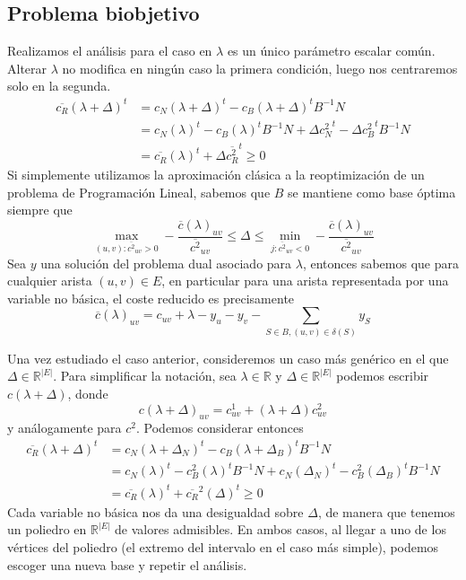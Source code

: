 \documentclass[twoside,a4paper,openright,12pt,tikz]{book}
\newcommand{\R}{\mathbb{R}}
\begin{document}
\subsection{Problema biobjetivo}
Realizamos el análisis para el caso en $\lambda$ es un único parámetro escalar común. Alterar $\lambda$ no modifica en ningún caso la primera condición, luego nos centraremos solo en la segunda. 
\begin{align*}
\overline{c_R}(\lambda+\Delta)^t&= c_N(\lambda + \Delta)^t  - c_B(\lambda + \Delta)^t B^{-1}N \\
& = c_N(\lambda)^t  - c_B(\lambda)^t B^{-1}N + \Delta {c_N^2}^t  - \Delta {c_B^2}^t B^{-1}N \\
&= \overline{c_R}(\lambda)^t + \Delta \overline{c_R^2}^t \geq 0
\end{align*}
Si simplemente utilizamos la aproximación clásica a la reoptimización de un problema de Programación Lineal, sabemos que $B$ se mantiene como base óptima siempre que
$$
\max_{(u,v):\overline{c^2}_{uv}>0} -\frac{\overline{c}(\lambda)_{uv}}{\overline{c^2}_{uv}} \leq \Delta \leq \min_{j:\overline{c^2}_{uv}<0} - \frac{\overline{c}(\lambda)_{uv}}{\overline{c^2}_{uv}}
$$
Sea $y$ una solución del problema dual asociado para $\lambda$, entonces sabemos que para cualquier arista $(u,v)\in E$, en particular para una arista representada por una variable no básica, el coste reducido es precisamente 
$$
\overline{c}(\lambda)_{uv} =c_{uv}+\lambda-y_u-y_v - \sum_{S\in B, (u,v)\in \delta(S)}y_S
$$

Una vez estudiado el caso anterior, consideremos un caso más genérico en el que $\Delta \in \R^{|E|}$. Para simplificar la notación, sea $\lambda \in \R$ y $\Delta \in \R^{|E|}$ podemos escribir $c(\lambda+\Delta)$, donde
$$
c(\lambda+\Delta)_{uv} = c^1_{uv}+(\lambda+\Delta)c^2_{uv}
$$
y análogamente para $c^2$. Podemos considerar entonces
\begin{align*}
\overline{c_R}(\lambda+\Delta)^t&= c_N(\lambda + \Delta_N)^t  - c_B(\lambda + \Delta_B)^t B^{-1}N \\
& = c_N(\lambda)^t  - c_B^2(\lambda)^t B^{-1}N + c_N(\Delta_N)^t  - c_B^2(\Delta_B)^t B^{-1}N \\
&=\overline{c_R}(\lambda)^t + \overline{c_R}^2(\Delta)^t \geq 0
\end{align*}
Cada variable no básica nos da una desigualdad sobre $\Delta$, de manera que tenemos un poliedro en $\R^{|E|}$ de valores admisibles. En ambos casos, al llegar a uno de los vértices del poliedro (el extremo del intervalo en el caso más simple), podemos escoger una nueva base y repetir el análisis.
\end{document}
